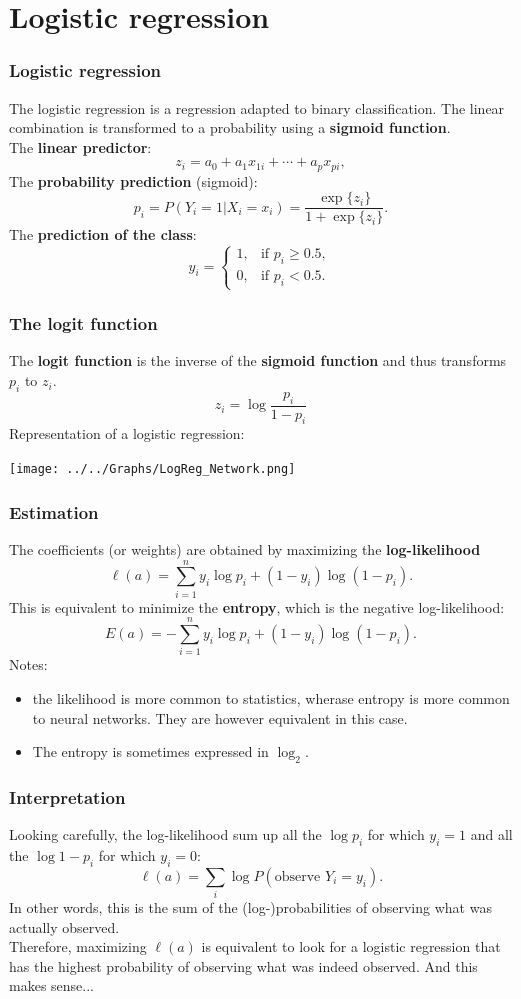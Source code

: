 \section{Logistic regression}
\begin{frame}
\frametitle{Logistic regression}
The logistic regression is a regression adapted to binary classification. The linear combination is transformed to a probability using a {\bf sigmoid function}.\\
\vspace{0.2cm}
The {\bf linear predictor}:
$$
z_i = a_0 + a_1 x_{1i} + \cdots + a_p x_{pi},
$$
The {\bf probability prediction} (sigmoid):
$$
p_i = P(Y_i=1 | X_i=x_i) = \frac{\exp\{z_i\}}{1+\exp\{z_i\}}.
$$
The {\bf prediction of the class}: 
$$
y_i = \left\{
\begin{array}{ll}
1, & \mbox{if } p_i\geq 0.5,\\
0, & \mbox{if } p_i<0.5.
\end{array}
\right.
$$
\end{frame}
\begin{frame}
\frametitle{The logit function}
The {\bf logit function} is the inverse of the {\bf sigmoid function} and thus transforms $p_i$ to $z_i$.
$$
z_i = \log \frac{p_i}{1-p_i}
$$ 
Representation of a logistic regression:
\begin{center}
\texttt{[image: ../../Graphs/LogReg\_Network.png]}
\end{center}
\end{frame}
\begin{frame}
\frametitle{Estimation}
The coefficients (or weights) are obtained by maximizing the {\bf log-likelihood}
$$
\ell(a) = \sum_{i=1}^n y_i \log p_i + (1-y_i) \log(1-p_i).
$$
This is equivalent to minimize the {\bf entropy}, which is the negative log-likelihood:
$$
E(a) = -\sum_{i=1}^n y_i \log p_i + (1-y_i) \log(1-p_i).
$$
\small
Notes: 
\begin{itemize}
\item the likelihood is more common to statistics, wherase entropy is more common to neural networks. They are however equivalent in this case. 
\item The entropy is sometimes expressed in $\log_2$.
\end{itemize}
\end{frame}
\begin{frame}
\frametitle{Interpretation}
Looking carefully, the log-likelihood sum up all the $\log p_i$ for which $y_i=1$ and all the $\log 1-p_i$ for which $y_i=0$:
$$
\ell(a) = \sum_i \log P(\mbox{observe }Y_i=y_i).
$$
In other words, this is the sum of the (log-)probabilities of observing what was actually observed.\\ 
\vspace{0.2cm}
Therefore, maximizing $\ell(a)$ is equivalent to look for a logistic regression that has the highest probability of observing what was indeed observed. And this makes sense...
\end{frame}
